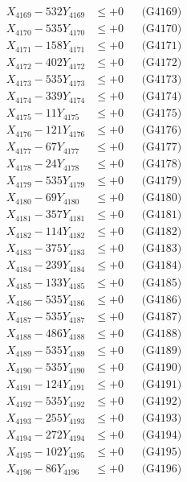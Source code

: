 \documentclass[a4paper,10pt]{article}
\begin{document}
{\begin{align}
X_{4169} - 532Y_{4169} &\leq +0 && \text{(G4169)} \\
X_{4170} - 535Y_{4170} &\leq +0 && \text{(G4170)} \\
\allowbreak
X_{4171} - 158Y_{4171} &\leq +0 && \text{(G4171)} \\
X_{4172} - 402Y_{4172} &\leq +0 && \text{(G4172)} \\
X_{4173} - 535Y_{4173} &\leq +0 && \text{(G4173)} \\
X_{4174} - 339Y_{4174} &\leq +0 && \text{(G4174)} \\
X_{4175} - 11Y_{4175} &\leq +0 && \text{(G4175)} \\
X_{4176} - 121Y_{4176} &\leq +0 && \text{(G4176)} \\
X_{4177} - 67Y_{4177} &\leq +0 && \text{(G4177)} \\
X_{4178} - 24Y_{4178} &\leq +0 && \text{(G4178)} \\
X_{4179} - 535Y_{4179} &\leq +0 && \text{(G4179)} \\
X_{4180} - 69Y_{4180} &\leq +0 && \text{(G4180)} \\
\allowbreak
X_{4181} - 357Y_{4181} &\leq +0 && \text{(G4181)} \\
X_{4182} - 114Y_{4182} &\leq +0 && \text{(G4182)} \\
X_{4183} - 375Y_{4183} &\leq +0 && \text{(G4183)} \\
X_{4184} - 239Y_{4184} &\leq +0 && \text{(G4184)} \\
X_{4185} - 133Y_{4185} &\leq +0 && \text{(G4185)} \\
X_{4186} - 535Y_{4186} &\leq +0 && \text{(G4186)} \\
X_{4187} - 535Y_{4187} &\leq +0 && \text{(G4187)} \\
X_{4188} - 486Y_{4188} &\leq +0 && \text{(G4188)} \\
X_{4189} - 535Y_{4189} &\leq +0 && \text{(G4189)} \\
X_{4190} - 535Y_{4190} &\leq +0 && \text{(G4190)} \\
\allowbreak
X_{4191} - 124Y_{4191} &\leq +0 && \text{(G4191)} \\
X_{4192} - 535Y_{4192} &\leq +0 && \text{(G4192)} \\
X_{4193} - 255Y_{4193} &\leq +0 && \text{(G4193)} \\
X_{4194} - 272Y_{4194} &\leq +0 && \text{(G4194)} \\
X_{4195} - 102Y_{4195} &\leq +0 && \text{(G4195)} \\
X_{4196} - 86Y_{4196} &\leq +0 && \text{(G4196)} \\

\end{align}}
\end{document}
